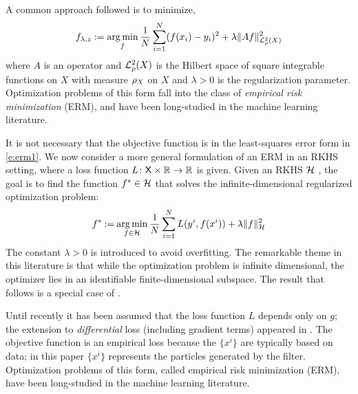 A common approach followed is to minimize,
\begin{equation}
f_{\reg,z} := \argmin_f \frac{1}{N}\sum_{i=1}^N (f(x_i) - y_i)^2 + \reg \|A f \|^2_{\mathcal{L}_{\pr}^2(X)}
\label{e:erm1}
\end{equation}
where $A$ is an operator and $\mathcal{L}^2_{\rho}(X)$ is the Hilbert space of square integrable functions on $X$ with measure $\rho_X$ on $X$ and $\lambda>0$ is the regularization parameter. Optimization problems of this form fall into the class of \textit{empirical risk minimization} (ERM), and have been long-studied in the machine learning literature.   

It is not necessary that the objective function is in the least-squares error form in \eqref{e:erm1}. We now consider a more general formulation of an ERM in an RKHS setting, where a loss function $L \colon  {\sf X}\times \mathbb{R} \to\mathbb{R}$ is given.   Given an RKHS ${\cal H}$ ,   the goal is to find the function $f^*\in{\cal H}$ that solves the infinite-dimensional regularized optimization problem:
\begin{equation}
f^* \eqdef \argmin_{f\in\clH} \frac{1}{N} \sum_{i=1}^N L(y^i,  f(x^i))     + \lambda \| f\|^2_{\clH}
\label{e:erm_rkhs}
\end{equation}
The constant $\lambda>0$ is introduced to avoid overfitting. 
The remarkable theme in this literature is that while the optimization problem is infinite dimensional,  the optimizer lies in an identifiable finite-dimensional subspace.
The result that follows is a special case of  \cite[Theorem~2]{zho08}.

Until recently it has been assumed that the loss function $L$ depends only on $g$;  the extension to \textit{differential} loss (including gradient terms) appeared in \cite{zho08}.    The objective function is an empirical loss  because the $\{x^i\}$ are typically based on data; in this paper $\{x^i\}$  represents the particles generated by the filter. Optimization problems of this form, called empirical risk minimization (ERM), have been long-studied in the machine learning literature.

